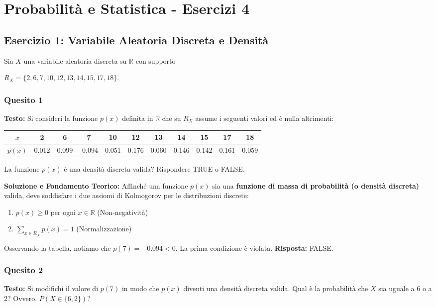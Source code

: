 \documentclass[12pt, a4paper]{article}
\begin{document}
\section*{Probabilità e Statistica - Esercizi 4}

\subsection*{Esercizio 1: Variabile Aleatoria Discreta e Densità}
Sia $X$ una variabile aleatoria discreta su $\mathbb{R}$ con supporto \\ 
    \begin{center}
        $R_X = \{2, 6, 7, 10, 12, 13, 14, 15, 17, 18\}$.
    \end{center}
\subsubsection*{Quesito 1}
\textbf{Testo:} Si consideri la funzione $p(x)$ definita in $\mathbb{R}$ che su $R_X$ assume i seguenti valori ed è nulla altrimenti:
\begin{center}
\begin{tabular}{c|cccccccccc}
\toprule
$x$ & 2 & 6 & 7 & 10 & 12 & 13 & 14 & 15 & 17 & 18 \\
\midrule
$p(x)$ & 0.012 & 0.099 & -0.094 & 0.051 & 0.176 & 0.060 & 0.146 & 0.142 & 0.161 & 0.059 \\
\bottomrule
\end{tabular}
\end{center}
La funzione $p(x)$ è una densità discreta valida? Rispondere TRUE o FALSE.

\textbf{Soluzione e Fondamento Teorico:} 
Affinché una funzione $p(x)$ sia una \textbf{funzione di massa di probabilità (o densità discreta)} valida, deve soddisfare i due assiomi di Kolmogorov per le distribuzioni discrete:
\begin{enumerate}
    \item $p(x) \ge 0$ per ogni $x \in \mathbb{R}$ (Non-negatività)
    \item $\sum_{x \in R_X} p(x) = 1$ (Normalizzazione)
\end{enumerate}
Osservando la tabella, notiamo che $p(7) = -0.094 < 0$. La prima condizione è violata.
\textbf{Risposta:} FALSE.

\subsubsection*{Quesito 2}
\textbf{Testo:} Si modifichi il valore di $p(7)$ in modo che $p(x)$ diventi una densità discreta valida. Qual è la probabilità che $X$ sia uguale a 6 o a 2? Ovvero, $P(X \in \{6,2\})$?
\end{document}
